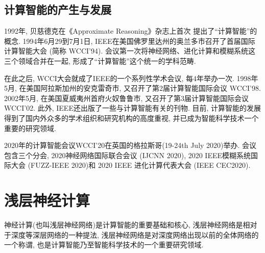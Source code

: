 \subsection{计算智能的产生与发展}
1992年, 贝慈德克在《Approximate Reasoning》杂志上首次 提出了“计算智能”的概念.
%
%
1994年6月29到7月1日, IEEE在美国佛罗里达州的奥兰多市召开了首届国际计算智能大会 (简称 WCCI'94). 会议第一次将神经网络、进化计算和模糊系统这三个领域合并在一起, 形成了“计算智能”这个统一的学科范畴.

在此之后, WCCI大会就成了IEEE的一个系列性学术会议, 每4年举办一次. 1998年5月, 在美国阿拉斯加州的安克雷奇市, 又召开了第2届计算智能国际会议 WCCI’98.
2002年5月, 在美国夏威夷州首府火奴鲁鲁市, 又召开了第3届计算智能国际会议WCCI'02.
此外, IEEE还出版了一些与计算智能有关的刊物.
目前, 计算智能的发展得到了国内外众多的学术组织和研究机构的高度重视, 并已成为智能科学技术一个重要的研究领域.

2020年的计算智能会议WCCI'20在英国的格拉斯哥(19-24th July 2020)举办. 会议包含三个分会, 2020神经网络国际联合会议 (IJCNN 2020), 2020 IEEE模糊系统国际大会 (FUZZ-IEEE 2020)和 2020 IEEE 进化计算代表大会 (IEEE CEC2020).
\section{浅层神经计算}
神经计算(也叫浅层神经网络)是计算智能的重要基础和核心, 浅层神经网络是相对于深度等深层网络的一种提法, 浅层神经网络是对深度网络出现以前的全体网络的一个称谓, 也是计算智能乃至智能科学技术的一个重要研究领域.

